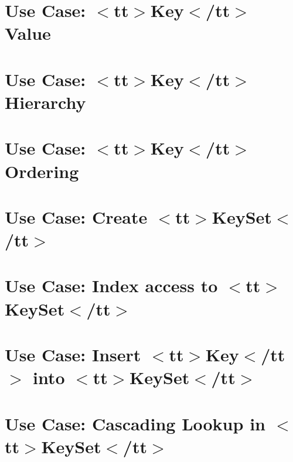 \let\mypdfximage\pdfximage\def\pdfximage{\immediate\mypdfximage}\documentclass[twoside]{book}
\newcommand{\+}{\discretionary{\mbox{\scriptsize$\hookleftarrow$}}{}{}}
\begin{document}
\chapter{Use Case\+: $<$tt$>$Key$<$/tt$>$ Value}
\label{doc_usecases_core_UC_key_value_md}

\chapter{Use Case\+: $<$tt$>$Key$<$/tt$>$ Hierarchy}
\label{doc_usecases_core_UC_keyname_hierarchy_md}

\chapter{Use Case\+: $<$tt$>$Key$<$/tt$>$ Ordering}
\label{doc_usecases_core_UC_keyname_ordering_md}

\chapter{Use Case\+: Create $<$tt$>$Key\+Set$<$/tt$>$}
\label{doc_usecases_core_UC_keyset_create_md}

\chapter{Use Case\+: Index access to $<$tt$>$Key\+Set$<$/tt$>$}
\label{doc_usecases_core_UC_keyset_index_access_md}

\chapter{Use Case\+: Insert $<$tt$>$Key$<$/tt$>$ into $<$tt$>$Key\+Set$<$/tt$>$}
\label{doc_usecases_core_UC_keyset_insert_md}

\chapter{Use Case\+: Cascading Lookup in $<$tt$>$Key\+Set$<$/tt$>$}
\label{doc_usecases_core_UC_keyset_lookup_cascading_md}

\end{document}
